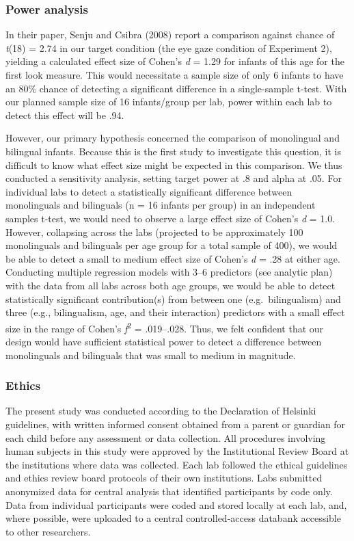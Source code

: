 \documentclass[,man,floatsintext]{apa6}
\begin{document}
\hypertarget{power-analysis}{%
\subsubsection{Power analysis}\label{power-analysis}}

In their paper, Senju and Csibra (2008) report a comparison against chance of \emph{t}(18) = 2.74 in our target condition (the eye gaze condition of Experiment 2), yielding a calculated effect size of Cohen's \emph{d} = 1.29 for infants of this age for the first look measure. This would necessitate a sample size of only 6 infants to have an 80\% chance of detecting a significant difference in a single-sample t-test. With our planned sample size of 16 infants/group per lab, power within each lab to detect this effect will be .94.

However, our primary hypothesis concerned the comparison of monolingual and bilingual infants. Because this is the first study to investigate this question, it is difficult to know what effect size might be expected in this comparison. We thus conducted a sensitivity analysis, setting target power at .8 and alpha at .05. For individual labs to detect a statistically significant difference between monolinguals and bilinguals (n = 16 infants per group) in an independent samples t-test, we would need to observe a large effect size of Cohen's \emph{d} = 1.0. However, collapsing across the labs (projected to be approximately 100 monolinguals and bilinguals per age group for a total sample of 400), we would be able to detect a small to medium effect size of Cohen's \emph{d} = .28 at either age. Conducting multiple regression models with 3--6 predictors (see analytic plan) with the data from all labs across both age groups, we would be able to detect statistically significant contribution(s) from between one (e.g.~bilingualism) and three (e.g., bilingualism, age, and their interaction) predictors with a small effect size in the range of Cohen's \emph{ƒ}\textsuperscript{2} = .019--.028. Thus, we felt confident that our design would have sufficient statistical power to detect a difference between monolinguals and bilinguals that was small to medium in magnitude.

\hypertarget{ethics}{%
\subsubsection{Ethics}\label{ethics}}

The present study was conducted according to the Declaration of Helsinki guidelines, with written informed consent obtained from a parent or guardian for each child before any assessment or data collection. All procedures involving human subjects in this study were approved by the Institutional Review Board at the institutions where data was collected. Each lab followed the ethical guidelines and ethics review board protocols of their own institutions. Labs submitted anonymized data for central analysis that identified participants by code only. Data from individual participants were coded and stored locally at each lab, and, where possible, were uploaded to a central controlled-access databank accessible to other researchers.
\end{document}
